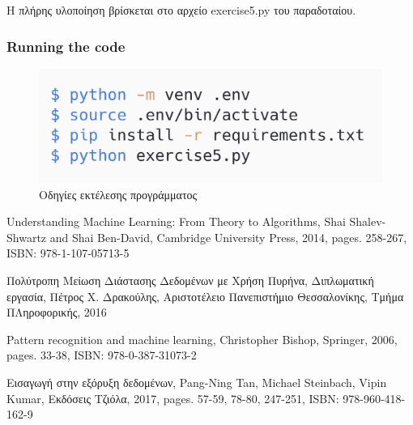 \documentclass[12pt]{article}
\newenvironment{matlab}
	{\begin{figure}[H]\centering\captionsetup{justification=centering}}
	{\end{figure}}
\begin{document}
Η πλήρης υλοποίηση βρίσκεται στο αρχείο exercise5.py του παραδοταίου. \\

\subsubsection*{Running the code}

\begin{matlab}
	\includegraphics[scale=0.3]{images/exercise5_run.png}
	\caption{Οδηγίες εκτέλεσης προγράμματος}
\end{matlab}

\pagebreak

\begin{thebibliography}{9}
	Understanding Machine Learning: From Theory to Algorithms, 
	Shai Shalev-Shwartz and Shai Ben-David,
	Cambridge University Press, 2014,
	pages. 258-267, 
	ISBN: 978-1-107-05713-5
	
	Πολύτροπη Μείωση Διάστασης Δεδομένων με Χρήση Πυρήνα,
	Διπλωματική εργασία, 
	Πέτρος Χ. Δρακούλης,
	Αριστοτέλειο Πανεπιστήμιο Θεσσαλονίκης, Τμήμα ΠΛηροφορικής, 2016
	
	Pattern recognition and machine learning, 	
	Christopher Bishop,
	Springer, 2006,
	pages. 33-38, 
	ISBN: 978-0-387-31073-2
	
	Εισαγωγή στην εξόρυξη δεδομένων, 	
	Pang-Ning Tan, Michael Steinbach, Vipin Kumar,
	Εκδόσεις Τζιόλα, 2017,
	pages. 57-59, 78-80, 247-251, 
	ISBN: 978-960-418-162-9
	
\end{thebibliography}
\end{document}
